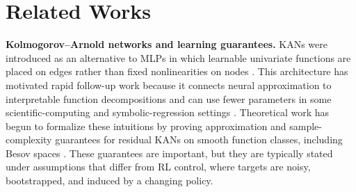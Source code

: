 \documentclass{article}
\begin{document}




\section{Related Works}

\textbf{Kolmogorov--Arnold networks and learning guarantees.}
KANs were introduced as an alternative to MLPs in which learnable univariate functions are placed on edges rather than fixed nonlinearities on nodes \cite{liu2024kan}.
This architecture has motivated rapid follow-up work because it connects neural approximation to interpretable function decompositions and can use fewer parameters in some scientific-computing and symbolic-regression settings \cite{somvanshi2025survey,essahraui2025kanoverview}.
Theoretical work has begun to formalize these intuitions by proving approximation and sample-complexity guarantees for residual KANs on smooth function classes, including Besov spaces \cite{kratsios2025besov}.
These guarantees are important, but they are typically stated under assumptions that differ from RL control, where targets are noisy, bootstrapped, and induced by a changing policy.
\end{document}
